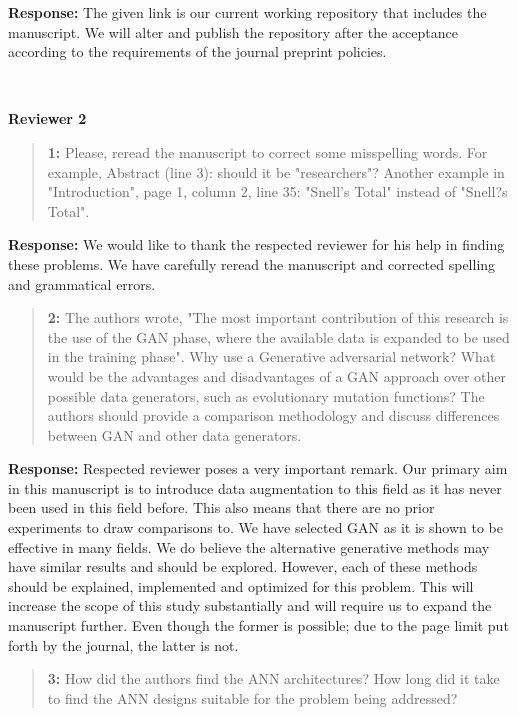 \documentclass{article}
\begin{document}
	\textbf{Response: }The given link is our current working repository that includes the manuscript. We will alter and publish the repository after the acceptance according to the requirements of the journal preprint policies.
	
	~
	
	{\bfseries\large Reviewer 2}
	
	\begin{quote}
		\textbf{1: }Please, reread the manuscript to correct some misspelling words. For example, Abstract (line 3): should it be "researchers"? Another example in "Introduction", page 1, column 2, line 35: "Snell's Total" instead of "Snell?s Total".
	\end{quote}
	
	\textbf{Response: }We would like to thank the respected reviewer for his help in finding these problems. We have carefully reread the manuscript and corrected spelling and grammatical errors.
	
	\begin{quote}
		\textbf{2: }The authors wrote, "The most important contribution of this research is the use of the GAN phase, where the available data is expanded to be used in the training phase". Why use a Generative adversarial network? What would be the advantages and disadvantages of a GAN approach over other possible data generators, such as evolutionary mutation functions? The authors should provide a comparison methodology and discuss differences between GAN and other data generators.
	\end{quote}
	
	\textbf{Response: }Respected reviewer poses a very important remark. Our primary aim in this manuscript is to introduce data augmentation to this field as it has never been used in this field before. This also means that there are no prior experiments to draw comparisons to. We have selected GAN as it is shown to be effective in many fields. We do believe the alternative generative methods may have similar results and should be explored. However, each of these methods should be explained, implemented and optimized for this problem. This will increase the scope of this study substantially and will require us to expand the manuscript further. Even though the former is possible; due to the page limit put forth by the journal, the latter is not.
	
	\begin{quote}
		\textbf{3: }How did the authors find the ANN architectures? How long did it take to find the ANN designs suitable for the problem being addressed?
	\end{quote}
	
\end{document}
